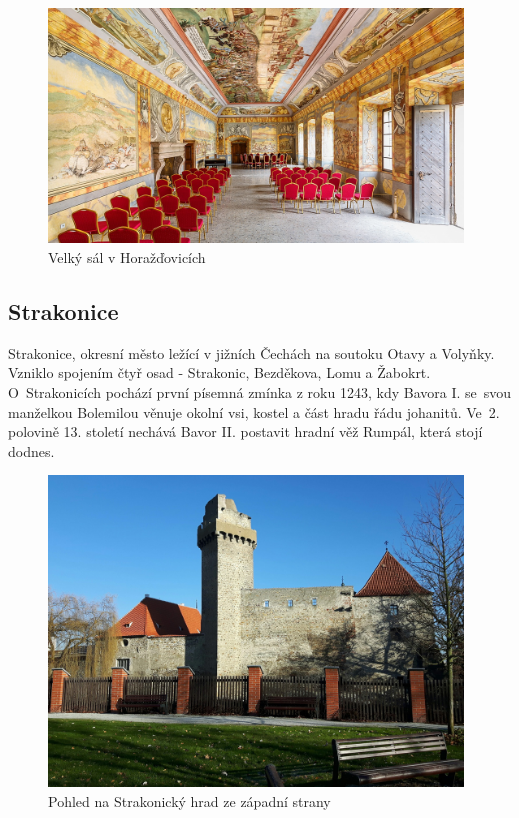 \documentclass[thesis=M,czech]{FITthesis}[2012/06/26]
\begin{document}
\begin{figure}[h!]
	\centering
	\includegraphics[width=11cm]{pics/hd.jpg}
	\caption{Velký sál v Horažďovicích}
	\label{obrazek:hd}
\end{figure}



\subsection{Strakonice}
Strakonice, okresní město ležící v jižních Čechách na soutoku Otavy a Volyňky. Vzniklo spojením čtyř osad - Strakonic, Bezděkova, Lomu a Žabokrt. O~Strakonicích pochází první písemná zmínka z roku 1243, kdy Bavora I. se~svou manželkou Bolemilou věnuje okolní vsi, kostel a část hradu řádu johanitů. Ve~2. polovině 13. století nechává Bavor II. postavit hradní věž Rumpál, která stojí dodnes. 

\begin{figure}[h!]
	\centering
	\includegraphics[width=11cm]{pics/hrad.jpg}
	\caption{Pohled na Strakonický hrad ze západní strany}
	\label{obrazek:hrad}
\end{figure}
\end{document}
